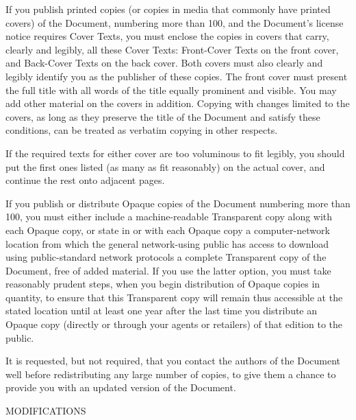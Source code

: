 If you publish printed copies (or copies in media that commonly
have printed covers) of the Document, numbering more than 100,
and the Document’s license notice requires Cover Texts,
you must enclose the copies in covers that carry, clearly and
legibly, all these Cover Texts: Front-Cover Texts on the front
cover, and Back-Cover Texts on the back cover. Both covers
must also clearly and legibly identify you as the publisher
of these copies. The front cover must present the full title
with all words of the title equally prominent and visible. You
may add other material on the covers in addition. Copying with
changes limited to the covers, as long as they preserve the
title of the Document and satisfy these conditions, can be
treated as verbatim copying in other respects.

If the required texts for either cover are too voluminous to
fit legibly, you should put the first ones listed (as many
as fit reasonably) on the actual cover, and continue the rest
onto adjacent pages.

If you publish or distribute Opaque copies of the
Document numbering more than 100, you must either include
a machine-readable Transparent copy along with each Opaque
copy, or state in or with each Opaque copy a computer-network
location from which the general network-using public has access
to download using public-standard network protocols a complete
Transparent copy of the Document, free of added material. If
you use the latter option, you must take reasonably prudent
steps, when you begin distribution of Opaque copies in
quantity, to ensure that this Transparent copy will remain
thus accessible at the stated location until at least one year
after the last time you distribute an Opaque copy (directly
or through your agents or retailers) of that edition to
the public.

It is requested, but not required, that you contact the authors
of the Document well before redistributing any large number of
copies, to give them a chance to provide you with an updated
version of the Document.


MODIFICATIONS


